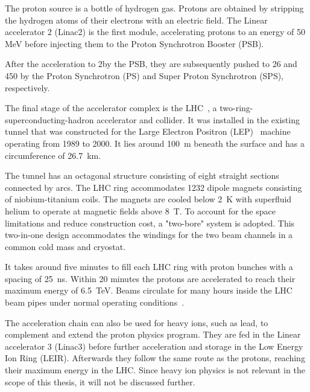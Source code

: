 The proton source is a bottle of hydrogen gas.
Protons are obtained by stripping the hydrogen atoms of their electrons with an electric field. The Linear accelerator 2 (Linac2) is the first module, accelerating protons to an energy of 50 MeV before injecting them to the Proton Synchrotron Booster (PSB).



After the acceleration to 2\GeV by the PSB, they are subsequently pushed to 26 \GeV and 450 \GeV by the Proton Synchrotron (PS) and Super Proton Synchrotron (SPS), respectively.

The final stage of the accelerator complex is the LHC~\cite{Evans:2008zzb}, a two-ring-superconducting-hadron accelerator and collider.
It was installed in the existing tunnel that was constructed for the Large Electron Positron (LEP)~\cite{LEP-TDR} machine operating from 1989 to 2000.
It lies around 100~m beneath the surface and has a circumference of 26.7~km.

The tunnel has an octagonal structure consisting of eight straight sections connected by arcs.
The LHC ring accommodates 1232 dipole magnets consisting of niobium-titanium coils.
The magnets are cooled below 2~K with superfluid helium to operate at magnetic fields above 8~T.
To account for the space limitations and reduce construction cost, a "two-bore"
system is adopted. This two-in-one design accommodates the windings for the two beam channels in a common cold mass and cryostat.

It takes around five minutes to fill each LHC ring with proton bunches with a spacing of 25~ns. Within 20 minutes the protons are accelerated to reach their maximum energy of 6.5~TeV. Beams circulate for many hours inside the LHC beam pipes under normal operating conditions~\cite{CERN-ACC-WEB}. 

The acceleration chain can also be used for heavy ions, such as lead, to complement and extend the proton physics program.
They are fed in the Linear accelerator 3 (Linac3) before further acceleration and storage in the Low Energy Ion Ring (LEIR).
Afterwards they follow the same route as the protons, reaching their maximum energy in the LHC. Since heavy ion physics is not relevant in the scope of this thesis, it will not be discussed further.

